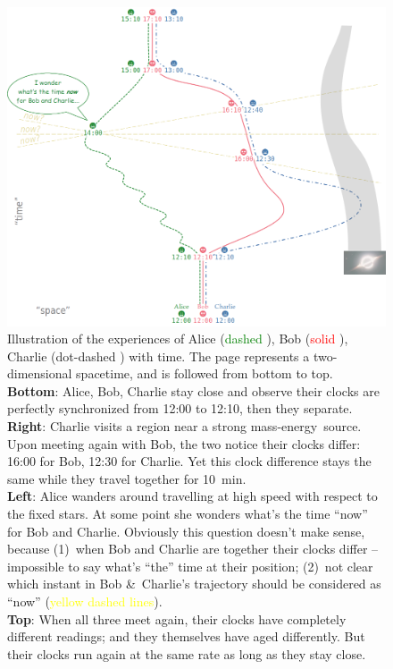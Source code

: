 \documentclass[a4paper,12pt,%
onecolumn,oneside,titlepage,%
british%
]{memoir}
\newcommand*{\amp}{\&}
\renewcommand*{\|}[1][]{\nonscript\:#1\vert\nonscript\:\mathopen{}}
\newcommand*{\masse}{mass-energy}
\begin{document}
\begin{figure}[p]
  \includegraphics[width=\linewidth]{ABC_spacetime.png}
  \caption{Illustration of the experiences of Alice (\textcolor{green}{dashed }), Bob (\textcolor{red}{solid }), Charlie (\textcolor{bluepurple}{dot-dashed }) with time. The page represents a two-dimensional spacetime, and is followed from bottom to top.
\\\textbf{Bottom}: Alice, Bob, Charlie stay close and observe their clocks are perfectly synchronized from 12:00 to 12:10, then they separate.
\\\textbf{Right}: Charlie visits a region near a strong \masse\ source. Upon meeting again with Bob, the two notice their clocks differ: 16:00 for Bob, 12:30 for Charlie. Yet this clock difference stays the same while they travel together for \qty{10}{min}.
\\\textbf{Left}: Alice wanders around travelling at high speed with respect to the fixed stars. At some point she wonders what's the time \enquote{now} for Bob and Charlie. Obviously this question doesn't make sense, because
(1)~when Bob and Charlie are together their clocks differ -- impossible to say what's \enquote{the} time at their position; (2)~not clear which instant in Bob \amp\ Charlie's trajectory should be considered as \enquote{now} (\textcolor{yellow}{yellow dashed lines}).
\\\textbf{Top}: When all three meet again, their clocks have completely different readings; and they themselves have aged differently. But their clocks run again at the same rate as long as they stay close.}  \label{fig:ABC_spacetime}
\end{figure}
\clearpage
\end{document}
